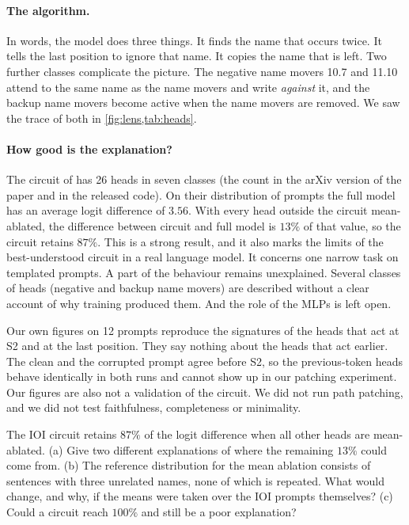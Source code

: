 \paragraph{The algorithm.} In words, the model does three things. It finds the name that occurs twice. It
tells the last position to ignore that name. It copies the name that is left. Two further classes complicate
the picture. The negative name movers 10.7 and 11.10 attend to the same name as the name movers and write
\emph{against} it, and the backup name movers become active when the name movers are removed. We saw the trace
of both in \cref{fig:lens,tab:heads}.

\paragraph{How good is the explanation?} The circuit of \citet{wang2023interpretability} has 26 heads in seven
classes (the count in the arXiv version of the paper and in the released code). On their distribution of
prompts the full model has an average logit difference of $3.56$. With every head outside the circuit
mean-ablated, the difference between circuit and full model is $13\%$ of that value, so the circuit retains
$87\%$. This is a strong result, and it also marks the limits of the best-understood circuit in a real language
model. It concerns one narrow task on templated prompts. A part of the behaviour remains unexplained. Several
classes of heads (negative and backup name movers) are described without a clear account of why training
produced them. And the role of the MLPs is left open.

\begin{caution}
Our own figures on 12 prompts reproduce the signatures of the heads that act at S2 and at the last position.
They say nothing about the heads that act earlier. The clean and the corrupted prompt agree before S2, so the
previous-token heads behave identically in both runs and cannot show up in our patching experiment. Our figures
are also not a validation of the circuit. We did not run path patching, and we did not test faithfulness,
completeness or minimality.
\end{caution}

\begin{exercise}\label{ex:eightyseven}
The IOI circuit retains $87\%$ of the logit difference when all other heads are mean-ablated. (a) Give two
different explanations of where the remaining $13\%$ could come from. (b) The reference distribution for the mean
ablation consists of sentences with three unrelated names, none of which is repeated. What would change, and
why, if the means were taken over the IOI prompts themselves? (c) Could a circuit reach $100\%$ and still be a
poor explanation?
\end{exercise}

